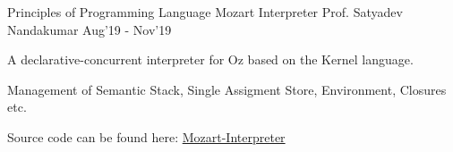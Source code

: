 
\begin{cventries}
  \cventry
  {Principles of Programming Language}
  {Mozart Interpreter}
  {Prof. Satyadev Nandakumar}
  {Aug'19 - Nov'19}
  {
    \begin{cvitems}
    \item A declarative-concurrent interpreter for Oz based on the Kernel language.
    \item Management of Semantic Stack, Single Assigment Store, Environment, Closures etc.
    \item Source code can be found here: \href{https://github.com/shubhsherl/Mozart-Interpreter}{Mozart-Interpreter}
    \end{cvitems}
  }

\end{cventries}

